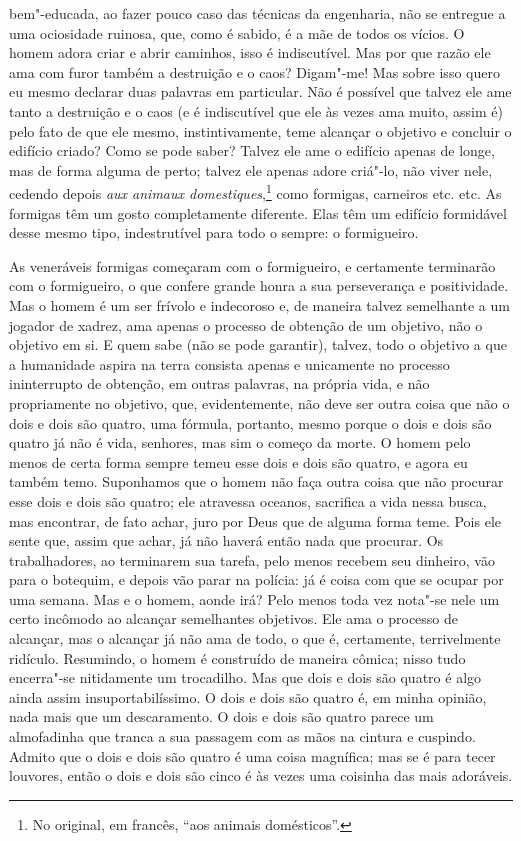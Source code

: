 bem"-educada, ao fazer pouco caso das técnicas da engenharia, não se entregue a
uma ociosidade ruinosa, que, como é sabido, é a mãe de todos os vícios. O homem
adora criar e abrir caminhos, isso é indiscutível. Mas por que razão ele ama
com furor também a destruição e o caos? Digam"-me! Mas sobre isso quero eu mesmo
declarar duas palavras em particular. Não é possível que talvez ele ame tanto a
destruição e o caos (e é indiscutível que ele às vezes ama muito, assim é) pelo
fato de que ele mesmo, instintivamente, teme alcançar o objetivo e concluir o
edifício criado? Como se pode saber? Talvez ele ame o edifício apenas de longe,
mas de forma alguma de perto; talvez ele apenas adore criá"-lo, não viver nele,
cedendo depois \textit{aux animaux domestiques},\footnote{No original, em
francês, ``aos animais domésticos''.} como formigas, carneiros etc. etc. As
formigas têm um gosto completamente diferente. Elas têm um edifício formidável
desse mesmo tipo, indestrutível para todo o sempre: o formigueiro.

As veneráveis formigas começaram com o formigueiro, e certamente
terminarão com o formigueiro, o que confere grande honra a sua
perseverança e positividade. Mas o homem é um ser frívolo e indecoroso
e, de maneira talvez semelhante a um jogador de xadrez, ama apenas o
processo de obtenção de um objetivo, não o objetivo em si. E quem sabe
(não se pode garantir), talvez, todo o objetivo a que a humanidade
aspira na terra consista apenas e unicamente no processo ininterrupto
de obtenção, em outras palavras, na própria vida, e não propriamente no
objetivo, que, evidentemente, não deve ser outra coisa que não o dois e
dois são quatro, uma fórmula, portanto, mesmo porque o dois e dois são
quatro já não é vida, senhores, mas sim o começo da morte. O homem pelo
menos de certa forma sempre temeu esse dois e dois são quatro, e agora
eu também temo. Suponhamos que o homem não faça outra coisa que não
procurar esse dois e dois são quatro; ele atravessa oceanos, sacrifica
a vida nessa busca, mas encontrar, de fato achar, juro por Deus que de
alguma forma teme. Pois ele sente que, assim que achar, já não haverá
então nada que procurar. Os trabalhadores, ao terminarem sua tarefa,
pelo menos recebem seu dinheiro, vão para o botequim, e depois vão
parar na polícia: já é coisa com que se ocupar por uma semana. Mas e o
homem, aonde irá? Pelo menos toda vez nota"-se nele um certo incômodo ao
alcançar semelhantes objetivos. Ele ama o processo de alcançar, mas o
alcançar já não ama de todo, o que é, certamente, terrivelmente
ridículo. Resumindo, o homem é construído de maneira cômica; nisso tudo
encerra"-se nitidamente um trocadilho. Mas que dois e dois são quatro é
algo ainda assim insuportabilíssimo. O dois e dois são quatro é, em
minha opinião, nada mais que um descaramento. O dois e dois são quatro
parece um almofadinha que tranca a sua passagem com as mãos na cintura
e cuspindo. Admito que o dois e dois são quatro é uma coisa magnífica;
mas se é para tecer louvores, então o dois e dois são cinco é às vezes
uma coisinha das mais adoráveis.

